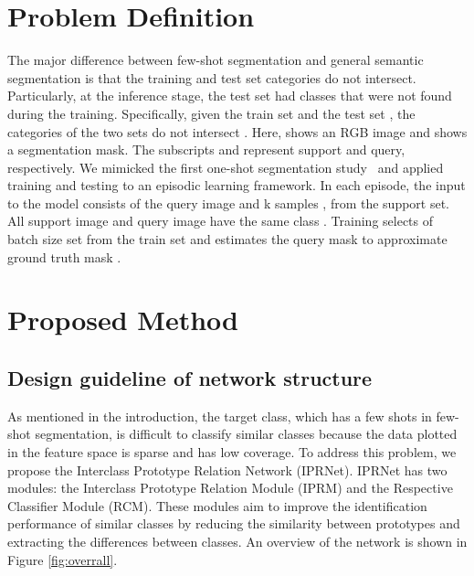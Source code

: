 \documentclass[runningheads]{llncs}
\begin{document}
\section{Problem Definition}
The major difference between few-shot segmentation and general semantic segmentation is that the training and test set categories do not intersect.
Particularly, at the inference stage, the test set had classes that were not found during the training.
Specifically, given the train set  and the test set , the categories of the two sets do not intersect .
Here,  shows an RGB image and  shows a segmentation mask.
The subscripts  and  represent support and query, respectively.
We mimicked the first one-shot segmentation study~\cite{Oneshot} and applied training and testing to an episodic learning framework.
In each episode, the input to the model consists of the query image  and k samples ,
 from the support set.
All support image and query image have the same class .
Training selects  of 
batch size  set from the train set  and estimates the query mask  to approximate ground truth mask .
\section{Proposed Method}
\subsection{Design guideline of network structure}
As mentioned in the introduction, the target class, which has a few
shots in few-shot segmentation, is difficult to classify similar classes because the data plotted in the feature space is sparse and has low coverage.
To address this problem, we propose the Interclass Prototype Relation Network (IPRNet).
IPRNet has two modules: the Interclass Prototype Relation Module (IPRM) and the Respective Classifier Module (RCM).
These modules aim to improve the identification performance of similar classes by reducing the similarity between prototypes and extracting the differences between classes.
An overview of the network is shown in Figure \ref{fig:overrall}.
\end{document}
